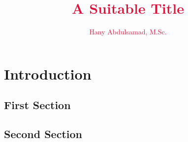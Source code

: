 \documentclass{iasthesis}
\newcommand{\filterminitoc}[1]{#1}
\newcommand{\minitocsection}{\begingroup\renewcommand{\filterminitoc}[1]{}\minitoc\endgroup}
\begin{document}
	
	\title{\textcolor{crimson} {A Suitable Title}}
	\author{\textcolor{crimson} {Hany Abdulsamad, M.Sc.}}
	
	\maketitle
	
	\begin{dedication}
		
	\end{dedication}

	
	
	\begin{acknowledgements}
		
	\end{acknowledgements}

	\begin{kurzfassung}
		\begin{otherlanguage}{ngerman}
			
		\end{otherlanguage}
	\end{kurzfassung}

	\begin{abstract}
		
	\end{abstract}
	
	\dominitoc[n]
		
	{
		\renewcommand{\raggedchapter}{\raggedleft}
		\renewcommand*{\chapterformat}{\thechapter}
		
		\tableofcontents
		\clearpage
	}
	
	
		
	\chapter{Introduction}
	\minitocsection 
	\kant
	\section{First Section}
	\kant
	\section{Second Section}
	\kant
\end{document}
